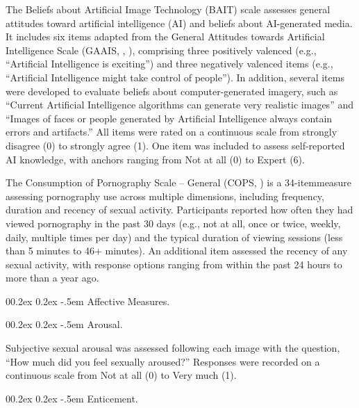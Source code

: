 \documentclass[
  jou,
  floatsintext,
  longtable,
  nolmodern,
  notxfonts,
  notimes,
  colorlinks=true,linkcolor=blue,citecolor=blue,urlcolor=blue]{apa7}
\makeatletter
\renewcommand{\paragraph}{\@startsection{paragraph}{4}{\parindent}%
	{0\baselineskip \@plus 0.2ex \@minus 0.2ex}%
	{-.5em}%
	{\normalfont\normalsize\bfseries\typesectitle}}
\makeatother
\begin{document}
The Beliefs about Artificial Image Technology (BAIT) scale assesses
general attitudes toward artificial intelligence (AI) and beliefs about
AI-generated media. It includes six items adapted from the General
Attitudes towards Artificial Intelligence Scale (GAAIS,
,
), comprising three positively
valenced (e.g., ``Artificial Intelligence is exciting'') and three
negatively valenced items (e.g., ``Artificial Intelligence might take
control of people''). In addition, several items were developed to
evaluate beliefs about computer-generated imagery, such as ``Current
Artificial Intelligence algorithms can generate very realistic images''
and ``Images of faces or people generated by Artificial Intelligence
always contain errors and artifacts.'' All items were rated on a
continuous scale from strongly disagree (0) to strongly agree (1). One
item was included to assess self-reported AI knowledge, with anchors
ranging from Not at all (0) to Expert (6).

The Consumption of Pornography Scale -- General (COPS,
) is a
34-itemmeasure assessing pornography use across multiple dimensions,
including frequency, duration and recency of sexual activity.
Participants reported how often they had viewed pornography in the past
30 days (e.g., not at all, once or twice, weekly, daily, multiple times
per day) and the typical duration of viewing sessions (less than 5
minutes to 46+ minutes). An additional item assessed the recency of any
sexual activity, with response options ranging from within the past 24
hours to more than a year ago.

\paragraph{Affective Measures.}\label{affective-measures}

\paragraph{Arousal.}\label{arousal}

Subjective sexual arousal was assessed following each image with the
question, ``How much did you feel sexually aroused?'' Responses were
recorded on a continuous scale from Not at all (0) to Very much (1).

\paragraph{Enticement.}\label{enticement}
\end{document}
